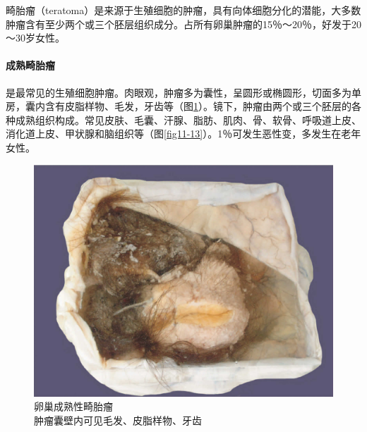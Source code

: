 畸胎瘤（teratoma）是来源于生殖细胞的肿瘤，具有向体细胞分化的潜能，大多数肿瘤含有至少两个或三个胚层组织成分。占所有卵巢肿瘤的15％～20％，好发于20～30岁女性。

\paragraph{成熟畸胎瘤}
是最常见的生殖细胞肿瘤。肉眼观，肿瘤多为囊性，呈圆形或椭圆形，切面多为单房，囊内含有皮脂样物、毛发，牙齿等（图\ref{fig11-12}）。镜下，肿瘤由两个或三个胚层的各种成熟组织构成。常见皮肤、毛囊、汗腺、脂肪、肌肉、骨、软骨、呼吸道上皮、消化道上皮、甲状腺和脑组织等（图\ref{fig11-13}）。1％可发生恶性变，多发生在老年女性。

\begin{figure}[!htbp]
 \centering
 \includegraphics{./images/Image00199.jpg}
 \captionsetup{justification=centering}
 \caption{卵巢成熟性畸胎瘤\\ {\small 肿瘤囊壁内可见毛发、皮脂样物、牙齿}}
\label{fig11-12}
  \end{figure}

